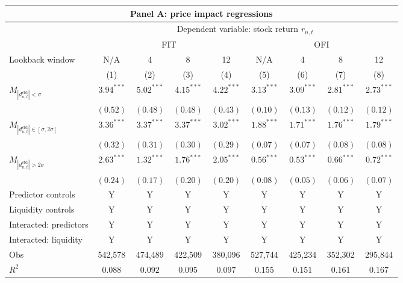 \begin{tabular}{lcccccccc}
  \hline \multicolumn{9}{c}{Panel A: price impact regressions} \\
 \hline
                                    & \multicolumn{8}{c}{Dependent variable: stock return $r_{n,t}$} \\

                                    \cmidrule(l){2-9} & \multicolumn{4}{c}{FIT} & \multicolumn{4}{c}{OFI} \\
 \cmidrule(l){2-5} \cmidrule(l){6-9} \vspace{5pt} 
 Lookback window & N/A & 4 & 8 & 12 & N/A & 4 & 8 & 12 \\
 \cmidrule(l){2-5} \cmidrule(l){6-9} 
  & (1) & (2) & (3) & (4) & (5) & (6) & (7) & (8) \\ 
  $M_{|d^\text{std}_{n,t}| < \sigma}$ & $3.94^{***}$ & $5.02^{***}$ & $4.15^{***}$ & $4.22^{***}$ & $3.13^{***}$ & $3.09^{***}$ & $2.81^{***}$ & $2.73^{***}$ \\ 
   & $(0.52)$ & $(0.48)$ & $(0.48)$ & $(0.43)$ & $(0.10)$ & $(0.13)$ & $(0.12)$ & $(0.12)$ \\ 
  $M_{|d^\text{std}_{n,t}| \in [\sigma, 2\sigma]}$ & $3.36^{***}$ & $3.37^{***}$ & $3.37^{***}$ & $3.02^{***}$ & $1.88^{***}$ & $1.71^{***}$ & $1.76^{***}$ & $1.79^{***}$ \\ 
   & $(0.32)$ & $(0.31)$ & $(0.30)$ & $(0.29)$ & $(0.07)$ & $(0.07)$ & $(0.08)$ & $(0.08)$ \\ 
  $M_{|d^\text{std}_{n,t}| > 2\sigma}$ & $2.63^{***}$ & $1.32^{***}$ & $1.76^{***}$ & $2.05^{***}$ & $0.56^{***}$ & $0.53^{***}$ & $0.66^{***}$ & $0.72^{***}$ \\ 
   \vspace{5pt} & $(0.24)$ & $(0.17)$ & $(0.20)$ & $(0.20)$ & $(0.08)$ & $(0.05)$ & $(0.06)$ & $(0.07)$ \\ 
  Predictor controls & Y & Y & Y & Y & Y & Y & Y & Y \\ 
  Liquidity controls & Y & Y & Y & Y & Y & Y & Y & Y \\ 
  Interacted: predictors & Y & Y & Y & Y & Y & Y & Y & Y \\ 
   \vspace{5pt}Interacted: liquidity & Y & Y & Y & Y & Y & Y & Y & Y \\ 
  Obs & 542,578 & 474,489 & 422,509 & 380,096 & 527,744 & 425,234 & 352,302 & 295,844 \\ 
  $R^2$ & $0.088$ & $0.092$ & $0.095$ & $0.097$ & $0.155$ & $0.151$ & $0.161$ & $0.167$ \\ 

\end{tabular}
